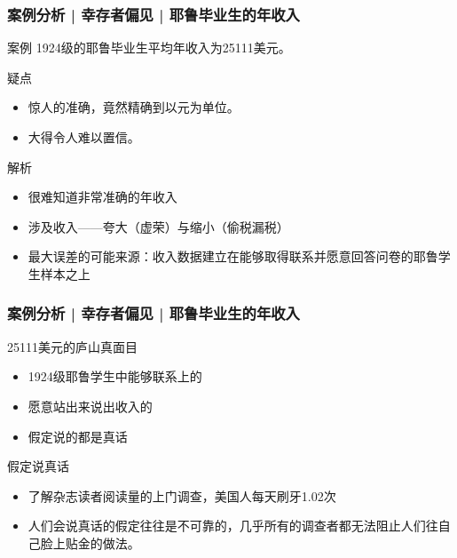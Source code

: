 \begin{frame}
  \frametitle{案例分析 | 幸存者偏见 | 耶鲁毕业生的年收入}
  \begin{block}{案例}
    1924级的耶鲁毕业生平均年收入为25111美元。
  \end{block}
  \pause
  \begin{block}{疑点}
    \begin{itemize}
      \item 惊人的准确，竟然精确到以元为单位。
      \item 大得令人难以置信。
    \end{itemize}
  \end{block}
  \pause
  \begin{block}{解析}
    \begin{itemize}
      \item 很难知道非常准确的年收入
      \item 涉及收入——夸大（虚荣）与缩小（偷税漏税）
      \item 最大误差的可能来源：收入数据建立在能够取得联系并愿意回答问卷的耶鲁学生样本之上
    \end{itemize}
  \end{block}
\end{frame}

\begin{frame}
  \frametitle{案例分析 | 幸存者偏见 | 耶鲁毕业生的年收入}
  \begin{block}{25111美元的庐山真面目}
    \begin{itemize}
      \item 1924级耶鲁学生中能够联系上的
      \item 愿意站出来说出收入的
      \item 假定说的都是真话
    \end{itemize}
  \end{block}
  \pause
  \begin{block}{假定说真话}
    \begin{itemize}
      \item 了解杂志读者阅读量的上门调查，美国人每天刷牙1.02次
      \item 人们会说真话的假定往往是不可靠的，几乎所有的调查者都无法阻止人们往自己脸上贴金的做法。
    \end{itemize}
  \end{block}
\end{frame}

